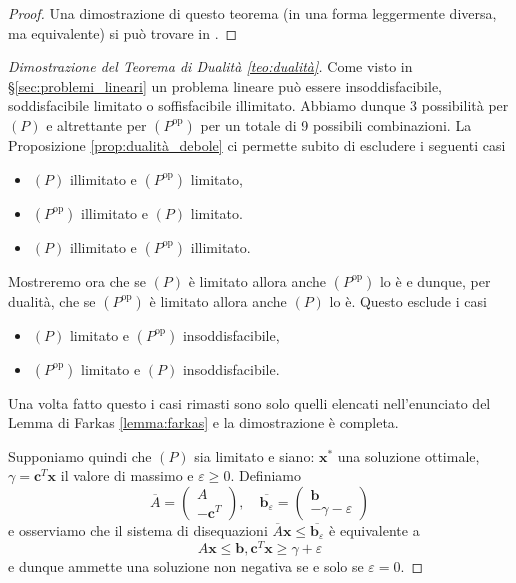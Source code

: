 \documentclass[italian, letter paper, 12pt, reqno]{article}
\theoremstyle{myteo}
\numberwithin{equation}{section}
\newcommand{\dual}[1]{#1^{\text{op}}}
\begin{document}
\begin{proof}
  Una dimostrazione di questo teorema (in una forma leggermente diversa, ma equivalente) si può trovare in \cite[Theorem 4.2.3]{understanding_linear_programming}.
\end{proof}

\begin{proof}[Dimostrazione del Teorema di Dualità \ref{teo:dualità}]
  Come visto in \S\ref{sec:problemi_lineari} un problema lineare può essere insoddisfacibile, soddisfacibile limitato o soffisfacibile illimitato.
  Abbiamo dunque 3 possibilità per \((P)\) e altrettante per \((\dual{P})\) per un totale di 9 possibili combinazioni.
  La Proposizione \ref{prop:dualità_debole} ci permette subito di escludere i seguenti casi
  \begin{itemize}
  \item \((P)\) illimitato e \((\dual{P})\) limitato,
  \item \((\dual{P})\) illimitato e \((P)\) limitato.
  \item \((P)\) illimitato e \((\dual{P})\) illimitato.
  \end{itemize}
  Mostreremo ora che se \((P)\) è limitato allora anche \((\dual{P})\) lo è e dunque, per dualità, che se \((\dual{P})\) è limitato allora anche \((P)\) lo è.
  Questo esclude i casi
  \begin{itemize}
  \item \((P)\) limitato e \((\dual{P})\) insoddisfacibile,
  \item \((\dual{P})\) limitato e \((P)\) insoddisfacibile.
  \end{itemize}
  Una volta fatto questo i casi rimasti sono solo quelli elencati nell'enunciato del Lemma di Farkas \ref{lemma:farkas} e la dimostrazione è completa.

  Supponiamo quindi che \((P)\) sia limitato e siano: \(\textbf{x}^*\) una soluzione ottimale, \(\gamma = \textbf{c}^T \textbf{x}\) il valore di massimo e \(\varepsilon \geq 0\).
  Definiamo
  \[\overline{A} =
    \begin{pmatrix}
      A\\
      -\textbf{c}^T
    \end{pmatrix},\quad \overline{\textbf{b}_\varepsilon} =
    \begin{pmatrix}
      \mathbf{b}\\
      -\gamma-\varepsilon
    \end{pmatrix}\]
  e osserviamo che il sistema di disequazioni \(\overline{A}\textbf{x} \leq \overline{\textbf{b}_\varepsilon}\) è equivalente a
  \[A \textbf{x} \leq \textbf{b}, \textbf{c}^T \textbf{x} \geq \gamma + \varepsilon\]
  e dunque ammette una soluzione non negativa se e solo se \(\varepsilon = 0\).


\end{proof}
\end{document}
